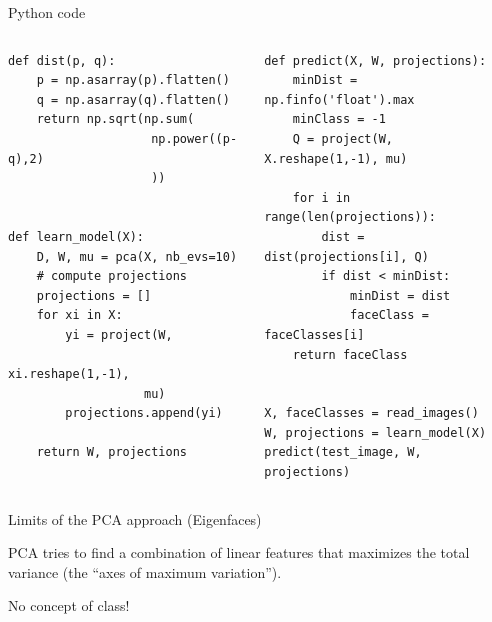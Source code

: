\documentclass[compress]{beamer}
\begin{document}
\begin{frame}[fragile]{Python code}


    \begin{columns}
        \begin{column}{0.5\linewidth}
\begin{verbatim}
def dist(p, q):
    p = np.asarray(p).flatten()
    q = np.asarray(q).flatten()
    return np.sqrt(np.sum(
                    np.power((p-q),2)
                    ))


def learn_model(X):
    D, W, mu = pca(X, nb_evs=10)
    # compute projections
    projections = []
    for xi in X:
        yi = project(W,
                   xi.reshape(1,-1), 
                   mu)
        projections.append(yi)

    return W, projections
\end{verbatim}

        \end{column}
        \begin{column}{0.5\linewidth}


\begin{verbatim}
def predict(X, W, projections):
    minDist = np.finfo('float').max
    minClass = -1
    Q = project(W, X.reshape(1,-1), mu)

    for i in range(len(projections)):
        dist = dist(projections[i], Q)
        if dist < minDist:
            minDist = dist
            faceClass = faceClasses[i]
    return faceClass


X, faceClasses = read_images()
W, projections = learn_model(X)
predict(test_image, W, projections)

\end{verbatim}
        \end{column}
    \end{columns}

\end{frame}

\begin{frame}{Limits of the PCA approach (Eigenfaces)}

    PCA tries to find a combination of linear features that maximizes the total
    variance (\ie the ``axes of maximum variation'').
    
    No concept of class!

\end{frame}

\end{document}
